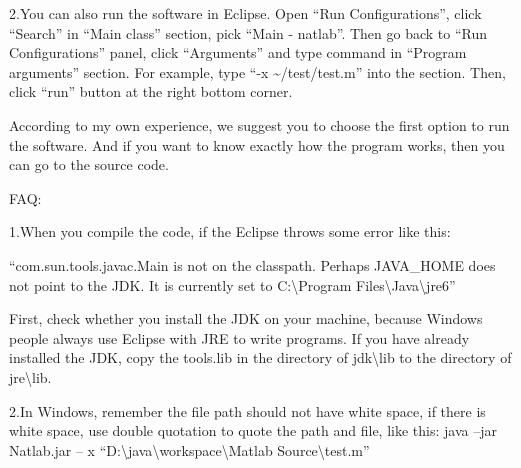 \documentclass[letterpaper]{article}
\begin{document}
2.You can also run the software in Eclipse. Open {\textquotedblleft}Run
Configurations{\textquotedblright}, click
{\textquotedblleft}Search{\textquotedblright} in
{\textquotedblleft}Main class{\textquotedblright} section, pick
{\textquotedblleft}Main - natlab{\textquotedblright}. Then go back to
{\textquotedblleft}Run Configurations{\textquotedblright} panel, click
{\textquotedblleft}Arguments{\textquotedblright} and type command in
{\textquotedblleft}Program arguments{\textquotedblright} section. For
example, type {\textquotedblleft}-x
\~{}/test/test.m{\textquotedblright} into the section. Then, click
{\textquotedblleft}run{\textquotedblright} button at the right bottom
corner.

According to my own experience, we suggest you to choose the first
option to run the software. And if you want to know exactly how the
program works, then you can go to the source code.


\bigskip

FAQ:

1.When you compile the code, if the Eclipse throws some error like this:


{\textquotedblleft}com.sun.tools.javac.Main is not on the classpath.
Perhaps JAVA\_HOME does not point to the JDK. It is currently set to
{\textquotedbl}C:{\textbackslash}Program
Files{\textbackslash}Java{\textbackslash}jre6{\textquotedbl}{\textquotedblright}

First, check whether you install the JDK on your machine, because
Windows people always use Eclipse with JRE to write programs. If you
have already installed the JDK, copy the tools.lib in the directory of
jdk{\textbackslash}lib to the directory of jre{\textbackslash}lib.

2.In Windows, remember the file path should not have white space, if
there is white space, use double quotation to quote the path and file,
like this: java --jar Natlab.jar -- x
{\textquotedblleft}D:{\textbackslash}java{\textbackslash}workspace{\textbackslash}Matlab
Source{\textbackslash}test.m{\textquotedblright}
\end{document}
